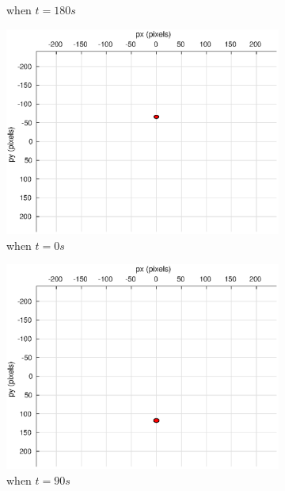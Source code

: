 \begin{figure}
\begin{subfigure}[b]{0.32\linewidth}
		\caption{when $t=180s$}
	\end{subfigure}
	\begin{subfigure}[b]{0.32\linewidth}
		\includegraphics[width=\textwidth]{images/chapter4/inertial_camera_-5mps}
		\caption{when $t=0s$}
	\end{subfigure}
	\begin{subfigure}[b]{0.32\linewidth}
		\includegraphics[width=\textwidth]{images/chapter4/inertial_camera_-5mps_90s}
		\caption{when $t=90s$}
	\end{subfigure}
	\begin{subfigure}[b]{0.32\linewidth}

\end{subfigure}
\end{figure}
